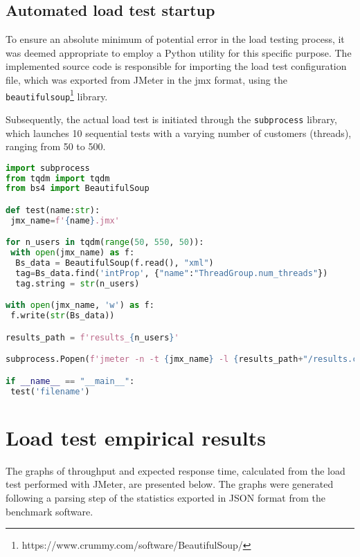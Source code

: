 \subsection{Automated load test startup}

To ensure an absolute minimum of potential error in the load testing process, it was deemed appropriate to employ a Python utility for this specific purpose. 
The implemented source code is responsible for importing the load test configuration file, which was exported from JMeter in the jmx format, using the \verb|beautifulsoup|\footnote[2]{https://www.crummy.com/software/BeautifulSoup/} library.

Subsequently, the actual load test is initiated through the \verb|subprocess| library, which launches 10 sequential tests with a varying number of customers (threads), ranging from 50 to 500.

\vspace{8mm}

\begin{lstlisting}[language=Python, caption={Python script for automated load test startup}, label={lst:python-script}]
import subprocess
from tqdm import tqdm
from bs4 import BeautifulSoup

def test(name:str):
 jmx_name=f'{name}.jmx'

for n_users in tqdm(range(50, 550, 50)):      
 with open(jmx_name) as f:
  Bs_data = BeautifulSoup(f.read(), "xml")
  tag=Bs_data.find('intProp', {"name":"ThreadGroup.num_threads"})
  tag.string = str(n_users)

with open(jmx_name, 'w') as f:
 f.write(str(Bs_data))

results_path = f'results_{n_users}'

subprocess.Popen(f'jmeter -n -t {jmx_name} -l {results_path+"/results.csv"} -e -o {results_path}', shell=True, stdout=subprocess.DEVNULL).wait()

if __name__ == "__main__":
 test('filename')
\end{lstlisting}

\section{Load test empirical results}

The graphs of throughput and expected response time, calculated from the load test performed with JMeter, are presented below.
The graphs were generated following a parsing step of the statistics exported in JSON format from the benchmark software.

